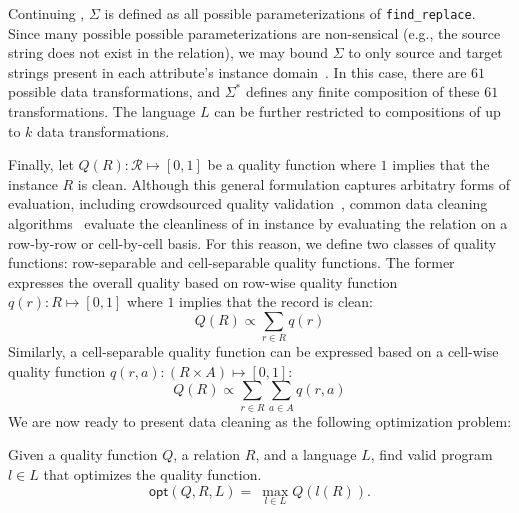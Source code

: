 \begin{example}\label{ex2}
  Continuing , $\Sigma$ is defined as all possible parameterizations of \texttt{find\_replace}.  Since many possible possible parameterizations are non-sensical (e.g., the source string does not exist in the relation), we may bound $\Sigma$ to only source and target strings present in each attribute's instance domain~\cite{workthatdoesthis}.  In this case, there are $61$ possible data transformations, and $\Sigma^*$ defines any finite composition of these $61$ transformations.  The language $L$ can be further restricted to compositions of up to $k$ data transformations.  
\end{example}

Finally, let $Q(R): \mathcal{R} \mapsto [0,1]$ be a quality function where $1$ implies that the instance $R$ is clean.
Although this general formulation captures arbitatry forms of evaluation, including crowdsourced quality validation~\cite{tamr,stuff}, common data cleaning algorithms~\cite{} evaluate the cleanliness of in instance by evaluating the relation on a row-by-row or cell-by-cell basis.  For this reason, we define two classes of quality functions: row-separable and cell-separable quality functions.
The former expresses the overall quality based on row-wise quality function $q(r): R \mapsto [0,1]$ where $1$ implies that the record is clean:
\[Q(R) \propto \sum_{r \in R} q(r)\]
\noindent Similarly, a cell-separable quality function can be expressed based on a cell-wise quality function $q(r, a): (R\times A) \mapsto [0,1]$:
\[Q(R) \propto \sum_{r \in R} \sum_{a \in A} q(r,a)\]
\noindent We are now ready to present data cleaning as the following optimization problem:
\begin{problem}
Given a quality function $Q$, a relation $R$, and a language $L$, find valid program $l \in L$ that optimizes the quality function.
\[
\textsf{opt}(Q,R,L) = ~ \max_{l \in L} Q( l(R) ).  
\]
\end{problem}

